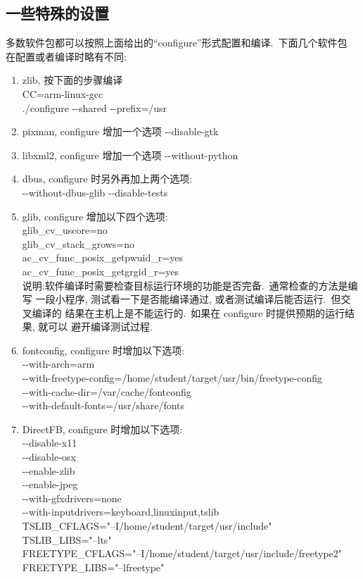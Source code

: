 \subsection{一些特殊的设置}
    多数软件包都可以按照上面给出的``configure''形式配置和编译.~下面几个软件包
在配置或者编译时略有不同:
\begin{enumerate}
  \item zlib, 按下面的步骤编译\\
      CC=arm-linux-gcc\\
      ./configure -{}-shared -{}-prefix=/usr

  \item pixman, configure 增加一个选项 -{}-disable-gtk

  \item libxml2, configure 增加一个选项 -{}-without-python

  \item dbus,  configure 时另外再加上两个选项:\\
      -{}-without-dbus-glib  -{}-disable-tests

  \item glib, configure 增加以下四个选项:\\
          glib\_cv\_uscore=no\\
          glib\_cv\_stack\_grows=no\\
          ac\_cv\_func\_posix\_getpwuid\_r=yes \\
          ac\_cv\_func\_posix\_getgrgid\_r=yes\\
    说明:软件编译时需要检查目标运行环境的功能是否完备.~通常检查的方法是编写
    一段小程序, 测试看一下是否能编译通过, 或者测试编译后能否运行.~但交叉编译的
    结果在主机上是不能运行的.~如果在 configure 时提供预期的运行结果, 就可以
    避开编译测试过程.

  \item fontconfig, configure 时增加以下选项:\\
      -{}-with-arch=arm \\
      -{}-with-freetype-config=/home/student/target/usr/bin/freetype-config \\
      -{}-with-cache-dir=/var/cache/fontconfig \\
      -{}-with-default-fonts=/usr/share/fonts

  \item DirectFB, configure 时增加以下选项:\\
      -{}-disable-x11 \\
      -{}-disable-osx \\
      -{}-enable-zlib \\
      -{}-enable-jpeg \\
      -{}-with-gfxdrivers=none \\
      -{}-with-inputdrivers=keyboard,linuxinput,tslib \\
      TSLIB\_CFLAGS="--I/home/student/target/usr/include" \\
      TSLIB\_LIBS="--lts" \\
      FREETYPE\_CFLAGS="--I/home/student/target/usr/include/freetype2" \\
      FREETYPE\_LIBS="--lfreetype"


\end{enumerate}
